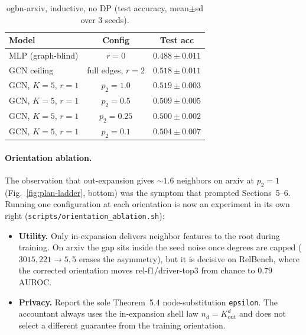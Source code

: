 \begin{table}[htbp]
  \centering\footnotesize
  \caption{ogbn-arxiv, inductive, no DP (test accuracy, mean$\pm$sd over 3 seeds).}
  \label{tab:plan-arxiv}
  \begin{tabular}{lcc}
    \toprule
    Model & Config & Test acc \\
    \midrule
    MLP (graph-blind) & $r{=}0$          & $0.488 \pm 0.011$ \\
    GCN ceiling       & full edges, $r{=}2$ & $0.518 \pm 0.011$ \\
    \midrule
    GCN, $K{=}5$, $r{=}1$ & $p_2{=}1.0$  & $0.519 \pm 0.003$ \\
    GCN, $K{=}5$, $r{=}1$ & $p_2{=}0.5$  & $0.509 \pm 0.005$ \\
    GCN, $K{=}5$, $r{=}1$ & $p_2{=}0.25$ & $0.500 \pm 0.002$ \\
    GCN, $K{=}5$, $r{=}1$ & $p_2{=}0.1$  & $0.504 \pm 0.007$ \\
    \bottomrule
  \end{tabular}
\end{table}

\paragraph{Orientation ablation.} The observation that out-expansion gives
$\sim\!1.6$ neighbors on arxiv at $p_2{=}1$ (Fig.~\ref{fig:plan-ladder}, bottom)
was the symptom that prompted Sections~5--6. Running one configuration at each
orientation is now an experiment in its own right
(\texttt{scripts/orientation\_ablation.sh}):
\begin{itemize}
  \item \textbf{Utility.} Only in-expansion delivers neighbor features to the
        root during training. On arxiv the gap sits inside the seed noise once
        degrees are capped ($3015,221 \to 5,5$ erases the asymmetry), but it is
        decisive on RelBench, where the corrected orientation moves
        rel-f1/driver-top3 from chance to $0.79$ AUROC.
  \item \textbf{Privacy.} Report the sole Theorem~5.4 node-substitution
        \texttt{epsilon}. The accountant always uses the in-expansion shell law
        $n_d=K_{\mathrm{out}}^d$ and does not select a different guarantee from
        the training orientation.
\end{itemize}

